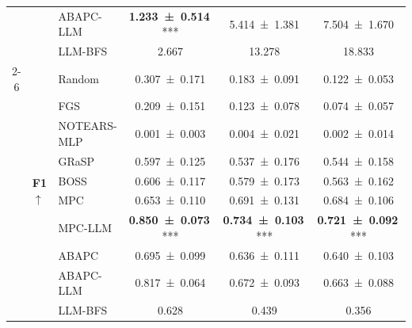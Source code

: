 \begin{table}[t]
{\begin{tabular}{cllccc}
     &  & ABAPC-LLM & {\bfseries \num{1.233 +- 0.514}}\,\textnormal{***} & \num{5.414 +- 1.381} & \num{7.504 +- 1.670} \\
     &  & LLM-BFS & \num{2.667} & \num{13.278} & \num{18.833} \\
    \cmidrule(lr){2-6}
     & \multirow{10}{*}{\textbf{F1 $\uparrow$}} & Random & \num{0.307 +- 0.171} & \num{0.183 +- 0.091} & \num{0.122 +- 0.053} \\
     &  & FGS & \num{0.209 +- 0.151} & \num{0.123 +- 0.078} & \num{0.074 +- 0.057} \\
     &  & NOTEARS-MLP & \num{0.001 +- 0.003} & \num{0.004 +- 0.021} & \num{0.002 +- 0.014} \\
     &  & GRaSP & \num{0.597 +- 0.125} & \num{0.537 +- 0.176} & \num{0.544 +- 0.158} \\
     &  & BOSS & \num{0.606 +- 0.117} & \num{0.579 +- 0.173} & \num{0.563 +- 0.162} \\
     &  & MPC & \num{0.653 +- 0.110} & \num{0.691 +- 0.131} & \num{0.684 +- 0.106} \\
     &  & MPC-LLM & {\bfseries \num{0.850 +- 0.073}}\,\textnormal{***} & {\bfseries \num{0.734 +- 0.103}}\,\textnormal{***} & {\bfseries \num{0.721 +- 0.092}}\,\textnormal{***} \\
     &  & ABAPC & \num{0.695 +- 0.099} & \num{0.636 +- 0.111} & \num{0.640 +- 0.103} \\
     &  & ABAPC-LLM & \num{0.817 +- 0.064} & \num{0.672 +- 0.093} & \num{0.663 +- 0.088} \\
     &  & LLM-BFS & \num{0.628} & \num{0.439} & \num{0.356} \\
    \bottomrule
    \end{tabular}
    }
\end{table}
